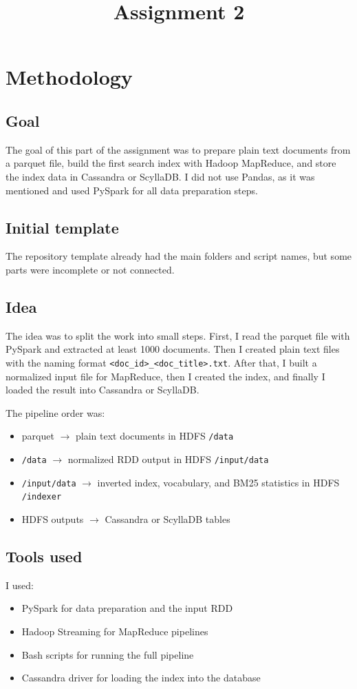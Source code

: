\documentclass[12pt]{article}
\title{Assignment 2}
\date{}
\begin{document}
\maketitle

\section{Methodology}
\subsection{Goal}
The goal of this part of the assignment was to prepare plain text documents from a parquet file, build the first search index with Hadoop MapReduce, and store the index data in Cassandra or ScyllaDB. I did not use Pandas, as it was mentioned and used PySpark for all data preparation steps.

\subsection{Initial template}
The repository template already had the main folders and script names, but some parts were incomplete or not connected. 

\subsection{Idea}
The idea was to split the work into small steps. First, I read the parquet file with PySpark and extracted at least 1000 documents. Then I created plain text files with the naming format \texttt{<doc\_id>\_<doc\_title>.txt}. After that, I built a normalized input file for MapReduce, then I created the index, and finally I loaded the result into Cassandra or ScyllaDB.

The pipeline order was:
\begin{itemize}
    \item parquet $\rightarrow$ plain text documents in HDFS \texttt{/data}
    \item \texttt{/data} $\rightarrow$ normalized RDD output in HDFS \texttt{/input/data}
    \item \texttt{/input/data} $\rightarrow$ inverted index, vocabulary, and BM25 statistics in HDFS \texttt{/indexer}
    \item HDFS outputs $\rightarrow$ Cassandra or ScyllaDB tables
\end{itemize}

\subsection{Tools used}
I used:
\begin{itemize}
    \item PySpark for data preparation and the input RDD
    \item Hadoop Streaming for MapReduce pipelines
    \item Bash scripts for running the full pipeline
    \item Cassandra driver for loading the index into the database
\end{itemize}
\end{document}
